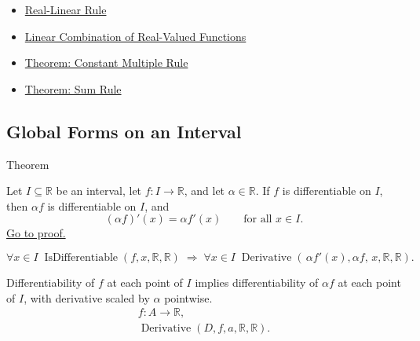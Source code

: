 \begin{dependencies}
\begin{itemize}
  \item \hyperref[def:real-linear-rule]{Real-Linear Rule}
  \item \hyperref[def:linear-combination-of-real-valued-functions]{Linear Combination of Real-Valued Functions}
  \item \hyperref[thm:constant-multiple-rule]{Theorem: Constant Multiple Rule}
  \item \hyperref[thm:sum-rule]{Theorem: Sum Rule}
\end{itemize}
\end{dependencies}

\subsection{Global Forms on an Interval}

\begin{theorembox}{Theorem}
\begin{theorem}
\label{thm:constant-multiple-rule-interval}
Let $I \subseteq \mathbb{R}$ be an interval, let $f : I \to \mathbb{R}$, and let $\alpha \in \mathbb{R}$. If $f$ is differentiable on $I$, then $\alpha f$ is differentiable on $I$, and
\[
(\alpha f)'(x) = \alpha f'(x) \qquad \text{for all } x \in I.
\]
\hyperref[prf:constant-multiple-rule-interval]{Go to proof.}
\end{theorem}
\end{theorembox}

\begin{remark*}
\[
\forall x \in I\;\operatorname{IsDifferentiable}(f,x,\mathbb{R},\mathbb{R})
\;\Rightarrow\;
\forall x \in I\;\operatorname{Derivative}(\,\alpha f'(x),\alpha f,\,x,\mathbb{R},\mathbb{R}).
\]
\end{remark*}

\begin{remark*}
Differentiability of $f$ at each point of $I$ implies differentiability of
$\alpha f$ at each point of $I$, with derivative scaled by $\alpha$ pointwise.
\[
\begin{aligned}
  f\colon A\to\mathbb{R},\\
  \operatorname{Derivative}(D,f,a,\mathbb{R},\mathbb{R}).
\end{aligned}
\]
\end{remark*}

